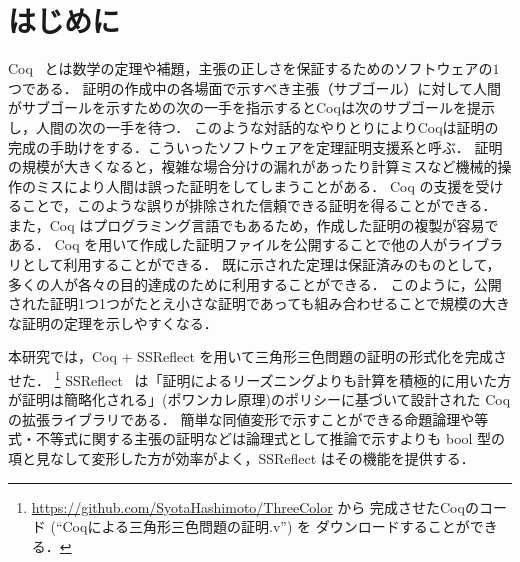 \section{はじめに} \label{sec:start}
Coq~\cite{Coq} とは数学の定理や補題，主張の正しさを保証するためのソフトウェアの$1$つである．
証明の作成中の各場面で示すべき主張（サブゴール）に対して人間がサブゴールを示すための次の一手を指示するとCoqは次のサブゴールを提示し，人間の次の一手を待つ．
このような対話的なやりとりによりCoqは証明の完成の手助けをする．こういったソフトウェアを定理証明支援系と呼ぶ．
証明の規模が大きくなると，複雑な場合分けの漏れがあったり計算ミスなど機械的操作のミスにより人間は誤った証明をしてしまうことがある．
Coq の支援を受けることで，このような誤りが排除された信頼できる証明を得ることができる．
また，Coq はプログラミング言語でもあるため，作成した証明の複製が容易である．
Coq を用いて作成した証明ファイルを公開することで他の人がライブラリとして利用することができる．
既に示された定理は保証済みのものとして，多くの人が各々の目的達成のために利用することができる．
このように，公開された証明1つ1つがたとえ小さな証明であっても組み合わせることで規模の大きな証明の定理を示しやすくなる．

本研究では，Coq + SSReflect を用いて三角形三色問題の証明の形式化を完成させた．
\footnote{
  \url{https://github.com/SyotaHashimoto/ThreeColor} から
  完成させたCoqのコード (``Coqによる三角形三色問題の証明.v'') を
  ダウンロードすることができる．
}
SSReflect~\cite{SSReflect,CoqBook} は「証明によるリーズニングよりも計算を積極的に用いた方が証明は簡略化される」(ポワンカレ原理)のポリシーに基づいて設計された Coq の拡張ライブラリである．
簡単な同値変形で示すことができる命題論理や等式・不等式に関する主張の証明などは論理式として推論で示すよりも bool 型の項と見なして変形した方が効率がよく，SSReflect はその機能を提供する．

